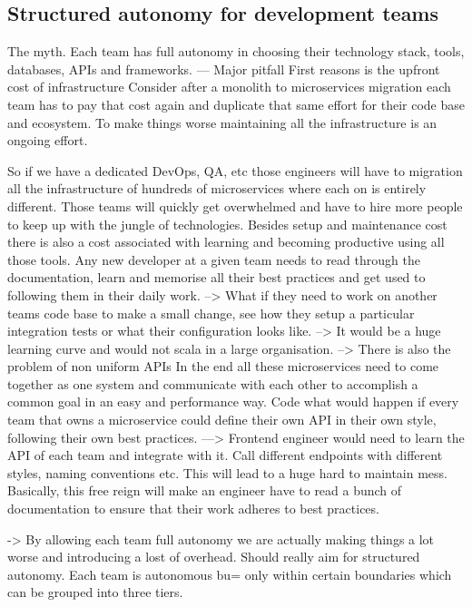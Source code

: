 \documentclass[a4paper, 11pt]{book}
\begin{document}
    \subsection{Structured autonomy for development teams}
    The myth.
    Each team has full autonomy in choosing their technology stack, tools, databases, APIs and frameworks.
    --- Major pitfall
    First reasons is the upfront cost of infrastructure
    Consider after a monolith to microservices migration each team has to pay that cost again and duplicate that same effort for their code base and ecosystem.
    To make things worse maintaining all the infrastructure is an ongoing effort.

    So if we have a dedicated DevOps, QA, etc those engineers will have to migration all the infrastructure of hundreds of microservices where each on is entirely different.
    Those teams will quickly get overwhelmed and have to hire more people to keep up with the jungle of technologies.
    Besides setup and maintenance cost there is also a cost associated with learning and becoming productive using all those tools.
    Any new developer at a given team needs to read through the documentation, learn and memorise all their best practices and get used to following them in their daily work.
    --> What if they need to work on another teams code base to make a small change, see how they setup a particular integration tests or what their configuration looks like.
    --> It would be a huge learning curve and would not scala in a large organisation.
    --> There is also the problem of non uniform APIs
    In the end all these microservices need to come together as one system and communicate with each other to accomplish a common goal in an easy and performance way.
    Code what would happen if every team that owns a microservice could define their own API in their own style, following their own best practices.
    ---> Frontend engineer would need to learn the API of each team and integrate with it.
    Call different endpoints with different styles, naming conventions etc.
    This will lead to a huge hard to maintain mess.
    Basically, this free reign will make an engineer have to read a bunch of documentation to ensure that their work adheres to best practices.

    -> By allowing each team full autonomy we are actually making things a lot worse and introducing a lost of overhead.
    Should really aim for structured autonomy.
    Each team is autonomous bu= only within certain boundaries which can be grouped into three tiers.
\end{document}
